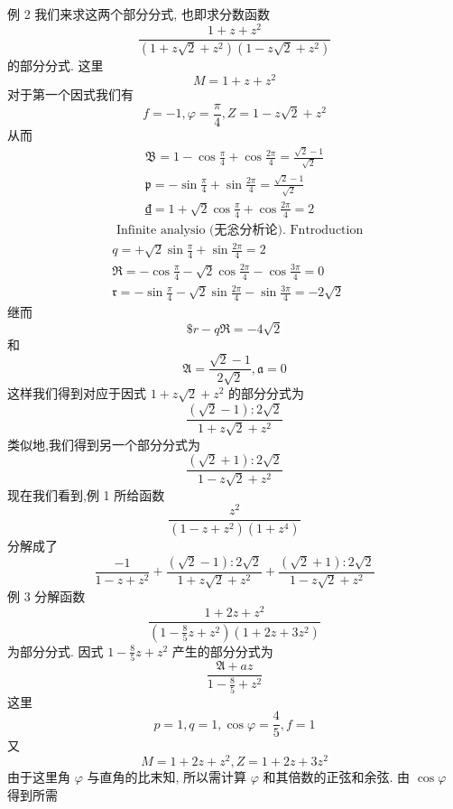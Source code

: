 例 2 我们来求这两个部分分式, 也即求分数函数
\[
\frac{1+z+z^{2}}{\left(1+z \sqrt{2}+z^{2}\right)\left(1-z \sqrt{2}+z^{2}\right)}
\]
的部分分式. 这里
\[
M=1+z+z^{2}
\]
对于第一个因式我们有
\[
f=-1, \varphi=\frac{\pi}{4}, Z=1-z \sqrt{2}+z^{2}
\]
从而
\[
\begin{gathered}
\mathfrak{B}=1-\cos \frac{\pi}{4}+\cos \frac{2 \pi}{4}=\frac{\sqrt{2}-1}{\sqrt{2}} \\
\mathfrak{p}=-\sin \frac{\pi}{4}+\sin \frac{2 \pi}{4}=\frac{\sqrt{2}-1}{\sqrt{2}} \\
₫=1+\sqrt{2} \cos \frac{\pi}{4}+\cos \frac{2 \pi}{4}=2
\end{gathered}
\]
\[
\begin{aligned}
& \text { Infinite analysio (无忩分析论). Fntroduction } \\
& q=+\sqrt{2} \sin \frac{\pi}{4}+\sin \frac{2 \pi}{4}=2 \\
& \mathfrak{R}=-\cos \frac{\pi}{4}-\sqrt{2} \cos \frac{2 \pi}{4}-\cos \frac{3 \pi}{4}=0 \\
& \mathfrak{r}=-\sin \frac{\pi}{4}-\sqrt{2} \sin \frac{2 \pi}{4}-\sin \frac{3 \pi}{4}=-2 \sqrt{2}
\end{aligned}
\]
继而
\[
\$ r-q \mathfrak{R}=-4 \sqrt{2}
\]
和
\[
\mathfrak{A}=\frac{\sqrt{2}-1}{2 \sqrt{2}}, \mathfrak{a}=0
\]
这样我们得到对应于因式 $1+z \sqrt{2}+z^{2}$ 的部分分式为
\[
\frac{(\sqrt{2}-1): 2 \sqrt{2}}{1+z \sqrt{2}+z^{2}}
\]
类似地,我们得到另一个部分分式为
\[
\frac{(\sqrt{2}+1): 2 \sqrt{2}}{1-z \sqrt{2}+z^{2}}
\]
现在我们看到,例 1 所给函数
\[
\frac{z^{2}}{\left(1-z+z^{2}\right)\left(1+z^{4}\right)}
\]
分解成了
\[
\frac{-1}{1-z+z^{2}}+\frac{(\sqrt{2}-1): 2 \sqrt{2}}{1+z \sqrt{2}+z^{2}}+\frac{(\sqrt{2}+1): 2 \sqrt{2}}{1-z \sqrt{2}+z^{2}}
\]
例 3 分解函数
\[
\frac{1+2 z+z^{2}}{\left(1-\frac{8}{5} z+z^{2}\right)\left(1+2 z+3 z^{2}\right)}
\]
为部分分式. 因式 $1-\frac{8}{5} z+z^{2}$ 产生的部分分式为
\[
\frac{\mathfrak{A}+a z}{1-\frac{8}{5}+z^{2}}
\]
这里
\[
p=1, q=1, \cos \varphi=\frac{4}{5}, f=1
\]
又
\[
M=1+2 z+z^{2}, Z=1+2 z+3 z^{2}
\]
由于这里角 $\varphi$ 与直角的比末知, 所以需计算 $\varphi$ 和其倍数的正弦和余弦. 由 $\cos \varphi$ 得到所需 

